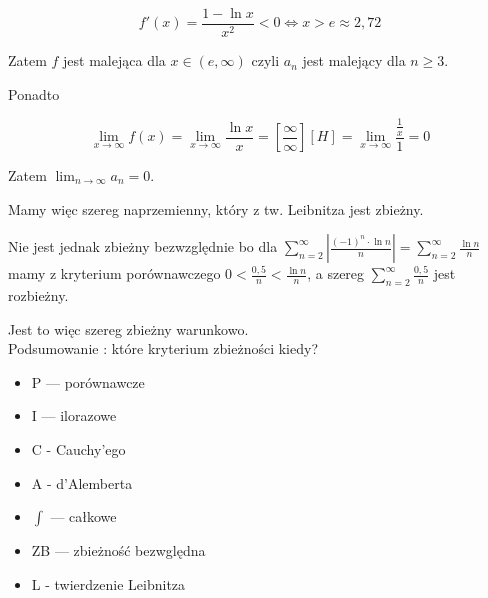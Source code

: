 $$ f'(x) = \frac{1 - \ln x}{x^2} < 0 \Leftrightarrow x > e \approx 2,72 $$

Zatem $f$ jest malejąca dla $ x \in (e, \infty) $ czyli $a_n$ jest malejący dla $n \geq 3$.

Ponadto

$$ \lim_{x \to \infty} f(x) = \lim_{x \to \infty} \frac{\ln x}{x} = \left[ \frac{\infty}{\infty} \right][H]
= \lim_{x \to \infty} \frac{\frac{1}{x}}{1} = 0 $$

Zatem $ \lim_{n \to \infty} a_n = 0 $.

Mamy więc szereg naprzemienny, który z tw. Leibnitza jest zbieżny.

Nie jest jednak zbieżny bezwzględnie bo dla $ \sum\limits_{n=2}^{\infty} \left| \frac{(-1)^n \cdot \ln n}{n} \right|
= \sum\limits_{n=2}^{\infty} \frac{\ln n}{n} $ mamy z kryterium porównawczego $0 < \frac{0,5}{n} < \frac{\ln n}{n}$,
a szereg $ \sum\limits_{n=2}^{\infty} \frac{0,5}{n} $ jest rozbieżny.

Jest to więc szereg zbieżny warunkowo. \\

Podsumowanie : które kryterium zbieżności kiedy?

\begin{itemize}
    \item P --- porównawcze
    \item I --- ilorazowe
    \item C - Cauchy'ego
    \item A - d'Alemberta
    \item $\int$ --- całkowe
    \item ZB --- zbieżność bezwględna
    \item L - twierdzenie Leibnitza \\
\end{itemize}

